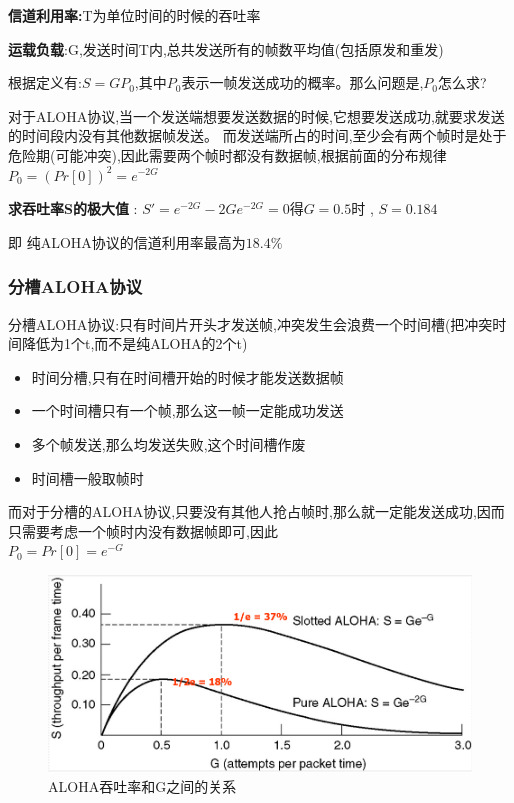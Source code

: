 \documentclass[UTF8,a4paper]{ctexart}
\begin{document}
\textbf{信道利用率:}T为单位时间的时候的吞吐率

\textbf{运载负载}:G,发送时间T内,总共发送所有的帧数平均值(包括原发和重发)

根据定义有:$S = GP_0$,其中$P_0$表示一帧发送成功的概率。那么问题是,$P_0$怎么求?

对于ALOHA协议,当一个发送端想要发送数据的时候,它想要发送成功,就要求发送的时间段内没有其他数据帧发送。
而发送端所占的时间,至少会有两个帧时是处于危险期(可能冲突),因此需要两个帧时都没有数据帧,根据前面的分布规律\\
$P_0 = (Pr[0])^2 = e^{-2G}$

\textbf{求吞吐率S的极大值} : $S' = e^{-2G}-2Ge^{-2G} = 0$得$G = 0.5$时 , $S = 0.184$

即 纯ALOHA协议的信道利用率最高为$18.4\%$

\subsubsection{分槽ALOHA协议}
分槽ALOHA协议:只有时间片开头才发送帧,冲突发生会浪费一个时间槽(把冲突时间降低为1个t,而不是纯ALOHA的2个t)
\begin{itemize}
  \item 时间分槽,只有在时间槽开始的时候才能发送数据帧
  \item 一个时间槽只有一个帧,那么这一帧一定能成功发送
  \item 多个帧发送,那么均发送失败,这个时间槽作废
  \item 时间槽一般取帧时
\end{itemize}

而对于分槽的ALOHA协议,只要没有其他人抢占帧时,那么就一定能发送成功,因而只需要考虑一个帧时内没有数据帧即可,因此\\
$P_0 = Pr[0] = e^{-G}$

\begin{figure}[H]
  \centering
  \includegraphics[scale = 0.3]{assets/jisuanjiwangluo_ab468.png}
  \caption{ALOHA吞吐率和G之间的关系}
\end{figure}
\end{document}
